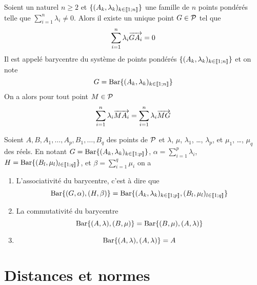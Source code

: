 \begin{prop}
  Soient un naturel $n \geq 2$ et $\{(A_k,\lambda_k)_{k \in 
  \intervalleentier{1}{n}}\}$ une famille de $n$ points pondérés telle que 
  $\sum_{i=1}^n \lambda_i \neq 0$. Alors il existe un unique point $G \in \P$ 
  tel que
  \begin{equation}
    \sum_{i=1}^n \lambda_i \vect{GA_i}=0
  \end{equation}
  Il est appelé barycentre du système de points pondérés $\{(A_k,\lambda_k)_{k 
  \in \intervalleentier{1}{n}}\}$ et on note
  \begin{equation}
    G = \Bary\{(A_k,\lambda_k)_{k \in \intervalleentier{1}{n}}\}
  \end{equation}
  On a alors pour tout point $M \in \P$
  \begin{equation}
    \sum_{i=1}^n \lambda_i \vect{MA_i} = \sum_{i=1}^n \lambda_i \vect{MG}
  \end{equation}
\end{prop}
\begin{prop}
  Soient $A,B, A_1, \ldots, A_p,B_1, \ldots, B_q$ des points de $\P$ et 
  $\lambda$, $\mu$, $\lambda_1$, \ldots, $\lambda_p$, et $\mu_1$, \ldots, 
  $\mu_q$ des réels. En notant $G = \Bary\{(A_k,\lambda_k)_{k \in 
  \intervalleentier{1}{p}}\}$, $\alpha=\sum_{i=1}^p \lambda_i$, $H = 
  \Bary\{(B_l,\mu_l)_{l \in \intervalleentier{1}{q}}\}$, et $\beta=\sum_{i=1}^q 
  \mu_i$ on a
  \begin{enumerate}
    \item L'associativité du barycentre, c'est à dire que
      \begin{equation}
        \Bary\{(G,\alpha),(H,\beta)\} = \Bary\{(A_k,\lambda_k)_{k \in 
        \intervalleentier{1}{p}}, (B_l,\mu_l)_{l \in \intervalleentier{1}{q}}\}
      \end{equation}
    \item La commutativité du barycentre
      \begin{equation}
        \Bary\{(A,\lambda),(B,\mu)\}=\Bary\{(B,\mu),(A,\lambda)\}
      \end{equation}
    \item
      \begin{equation}
        \Bary\{(A,\lambda),(A,\lambda)\}=A
      \end{equation}
  \end{enumerate}
\end{prop}

\section{Distances et normes}

